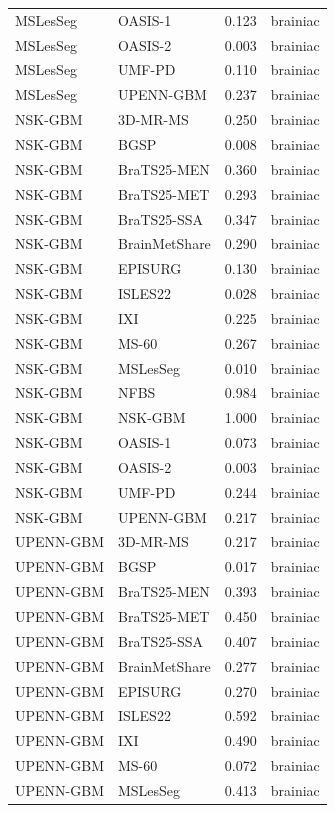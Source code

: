 \begin{tabular}{llrl}
MSLesSeg & OASIS-1 & 0.123 & brainiac \\
MSLesSeg & OASIS-2 & 0.003 & brainiac \\
MSLesSeg & UMF-PD & 0.110 & brainiac \\
MSLesSeg & UPENN-GBM & 0.237 & brainiac \\
NSK-GBM & 3D-MR-MS & 0.250 & brainiac \\
NSK-GBM & BGSP & 0.008 & brainiac \\
NSK-GBM & BraTS25-MEN & 0.360 & brainiac \\
NSK-GBM & BraTS25-MET & 0.293 & brainiac \\
NSK-GBM & BraTS25-SSA & 0.347 & brainiac \\
NSK-GBM & BrainMetShare & 0.290 & brainiac \\
NSK-GBM & EPISURG & 0.130 & brainiac \\
NSK-GBM & ISLES22 & 0.028 & brainiac \\
NSK-GBM & IXI & 0.225 & brainiac \\
NSK-GBM & MS-60 & 0.267 & brainiac \\
NSK-GBM & MSLesSeg & 0.010 & brainiac \\
NSK-GBM & NFBS & 0.984 & brainiac \\
NSK-GBM & NSK-GBM & 1.000 & brainiac \\
NSK-GBM & OASIS-1 & 0.073 & brainiac \\
NSK-GBM & OASIS-2 & 0.003 & brainiac \\
NSK-GBM & UMF-PD & 0.244 & brainiac \\
NSK-GBM & UPENN-GBM & 0.217 & brainiac \\
UPENN-GBM & 3D-MR-MS & 0.217 & brainiac \\
UPENN-GBM & BGSP & 0.017 & brainiac \\
UPENN-GBM & BraTS25-MEN & 0.393 & brainiac \\
UPENN-GBM & BraTS25-MET & 0.450 & brainiac \\
UPENN-GBM & BraTS25-SSA & 0.407 & brainiac \\
UPENN-GBM & BrainMetShare & 0.277 & brainiac \\
UPENN-GBM & EPISURG & 0.270 & brainiac \\
UPENN-GBM & ISLES22 & 0.592 & brainiac \\
UPENN-GBM & IXI & 0.490 & brainiac \\
UPENN-GBM & MS-60 & 0.072 & brainiac \\
UPENN-GBM & MSLesSeg & 0.413 & brainiac \\

\end{tabular}

